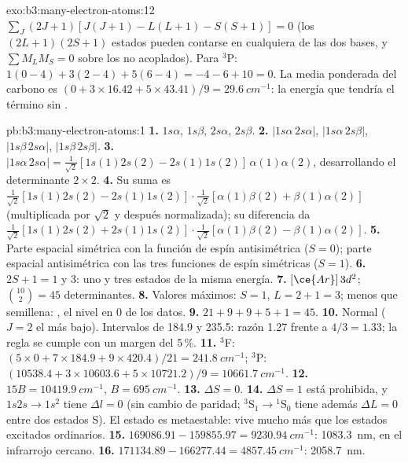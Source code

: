 \begin{solution}{exo:b3:many-electron-atoms:12}
$\sum_J(2J+1)[J(J+1) - L(L+1) - S(S+1)] = 0$ (los $(2L+1)(2S+1)$ estados pueden
contarse en cualquiera de las dos bases, y $\sum M_LM_S = 0$ sobre los no acoplados).
Para ${}^3$P: $1(0 - 4) + 3(2 - 4) + 5(6 - 4) = -4 - 6 + 10 = 0$. La media
ponderada del carbono es $(0 + 3 \times 16.42 + 5 \times 43.41)/9 = \qty{29.6}{cm^{-1}}$:
la energía que tendría el término sin .
\end{solution}

\begin{solution}{pb:b3:many-electron-atoms:1}
\textbf{1.} $1s\alpha$, $1s\beta$, $2s\alpha$, $2s\beta$.
\textbf{2.} $|1s\alpha\,2s\alpha|$, $|1s\alpha\,2s\beta|$, $|1s\beta\,2s\alpha|$,
$|1s\beta\,2s\beta|$.
\textbf{3.} $|1s\alpha\,2s\alpha| = \frac{1}{\sqrt2}[1s(1)2s(2) - 2s(1)1s(2)]\,
\alpha(1)\alpha(2)$, desarrollando el determinante $2\times2$.
\textbf{4.} Su suma es $\frac{1}{\sqrt2}[1s(1)2s(2) - 2s(1)1s(2)]\cdot
\frac{1}{\sqrt2}[\alpha(1)\beta(2) + \beta(1)\alpha(2)]$ (multiplicada por $\sqrt2$ y
después normalizada); su diferencia da $\frac{1}{\sqrt2}[1s(1)2s(2) +
2s(1)1s(2)]\cdot\frac{1}{\sqrt2}[\alpha(1)\beta(2) - \beta(1)\alpha(2)]$.
\textbf{5.} Parte espacial simétrica con la función de espín antisimétrica ($S = 0$);
parte espacial antisimétrica con las tres funciones de espín simétricas ($S = 1$).
\textbf{6.} $2S + 1 = 1$ y 3: uno y tres estados de la misma energía.
\textbf{7.} $[\ce{Ar}]\,3d^2$; $\binom{10}{2} = 45$ determinantes.
\textbf{8.} Valores máximos: $S = 1$, $L = 2 + 1 = 3$; menos que semillena:
, el nivel en 0 de los datos.
\textbf{9.} $21 + 9 + 9 + 5 + 1 = 45$.
\textbf{10.} Normal ($J = 2$ el más bajo). Intervalos de 184.9 y 235.5: razón 1.27
frente a $4/3 = 1.33$; la regla se cumple con un margen del 5\,\%.
\textbf{11.} ${}^3$F: $(5 \times 0 + 7 \times 184.9 + 9 \times 420.4)/21 =
\qty{241.8}{cm^{-1}}$; ${}^3$P: $(10538.4 + 3 \times 10603.6 + 5 \times
10721.2)/9 = \qty{10661.7}{cm^{-1}}$.
\textbf{12.} $15B = \qty{10419.9}{cm^{-1}}$, $B = \qty{695}{cm^{-1}}$.
\textbf{13.} $\Delta S = 0$.
\textbf{14.} $\Delta S = 1$ está prohibida, y $1s2s \to 1s^2$ tiene $\Delta l = 0$
(sin cambio de paridad; ${}^3$S$_1 \to {}^1$S$_0$ tiene además $\Delta L = 0$ entre dos estados
S). El estado es metaestable: vive mucho más que los estados excitados
ordinarios.
\textbf{15.} $169086.91 - 159855.97 = \qty{9230.94}{cm^{-1}}$: \qty{1083.3}{nm}, en
el infrarrojo cercano.
\textbf{16.} $171134.89 - 166277.44 = \qty{4857.45}{cm^{-1}}$: \qty{2058.7}{nm}.

\end{solution}
